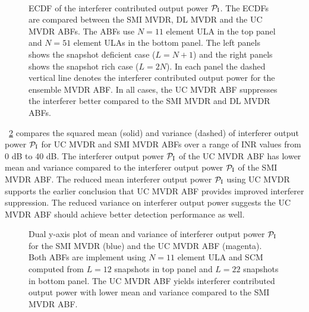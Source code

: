 \begin{figure}[!hp]
  \centering
  \\
  \vfill
  \caption[The ECDF of the interferer contributed output
  power for the SMI MVDR, the DL MVDR and the UC MVDR ABF.]{ ECDF of the interferer contributed output power
    $\pinter$. The ECDFs are compared between the SMI MVDR, DL MVDR
    and the UC MVDR ABFs. The ABFs use $N = 11$ element ULA in the top
    panel and $N = 51$ element ULAs in the bottom panel. The left
    panels shows the snapshot deficient case ($L = N + 1$) and the
    right panels shows the snapshot rich case ($L = 2N$). In each
    panel the dashed vertical line denotes the interferer contributed
    output power for the ensemble MVDR ABF. In all cases, the UC MVDR
    ABF suppresses the interferer better compared to the SMI MVDR and
    DL MVDR ABFs.}
  \label{fig:ecdf-plots}
\end{figure}

\figurename{}~\ref{fig:pout-mean-var-plots} compares the squared mean
(solid) and variance (dashed) of interferer output power $\pinter$ for
UC MVDR and SMI MVDR ABFs over a range of INR values from 0 dB to 40
dB. The interferer output power $\pinter$ of the UC MVDR ABF has lower
mean and variance compared to the interferer output power $\pinter$ of
the SMI MVDR ABF. The reduced mean interferer output power $\pinter$
using UC MVDR supports the earlier conclusion that UC MVDR ABF
provides improved interferer suppression. The reduced variance on
interferer output power suggests the UC MVDR ABF should achieve better
detection performance as well.

\begin{figure*}[!hp]
  \centering
    \hfill
  \caption[Mean and variance of interferer output power $\pinter$ for the SMI MVDR and the UC MVDR ABF]{Dual y-axis plot of mean and variance of interferer output power $\pinter$ for the SMI MVDR (blue) and the UC MVDR ABF (magenta). Both ABFs are implement using $N = 11$ element ULA and SCM computed from $L = 12$ snapshots in top panel and $L = 22$ snapshots in bottom panel. The UC MVDR ABF yields interferer contributed output power with lower mean and variance compared to the SMI MVDR ABF.}
  \label{fig:pout-mean-var-plots}
\end{figure*}

